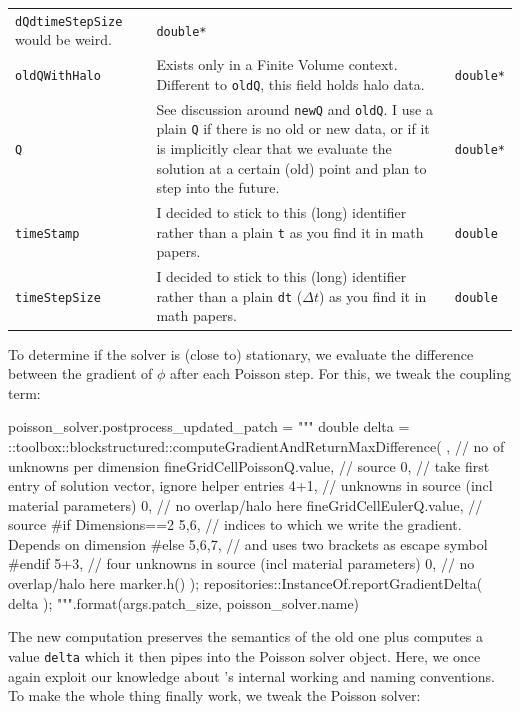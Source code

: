 \begin{table}
\begin{center}
\begin{tabular}{l|p{9cm}|p{2cm}}
     \texttt{dQdtimeStepSize} would be weird. & \texttt{double*}
     \\
   \texttt{oldQWithHalo} 
     & Exists only in a Finite Volume context. Different to \texttt{oldQ}, this
     field holds halo data.
     & \texttt{double*}
     \\
   \texttt{Q} 
     & See discussion around \texttt{newQ} and \texttt{oldQ}. I use a plain
     \texttt{Q} if there is no old or new data, or if it is implicitly clear
     that we evaluate the solution at a certain (old) point and plan to step
     into the future. 
     & \texttt{double*} \\
   \texttt{timeStamp} 
     & I decided to stick to this (long) identifier rather than a plain
     \texttt{t} as you find it in math papers. & \texttt{double} \\
   \texttt{timeStepSize} 
     & I decided to stick to this (long) identifier rather than a plain
     \texttt{dt} ($\Delta t$) as you find it in math papers. & \texttt{double}
     \\
  \end{tabular}
 \end{center}
\end{table}

To determine if the solver is (close to) stationary, we evaluate the difference 
between the gradient of $\phi$ after each Poisson step.
For this, we tweak the coupling term: 

\begin{code}
poisson_solver.postprocess_updated_patch = """
 double delta = 
 ::toolbox::blockstructured::computeGradientAndReturnMaxDifference(
   {},      // no of unknowns per dimension
   fineGridCellPoissonQ.value, // source
   0,       // take first entry of solution vector, ignore helper entries
   4+1,     // unknowns in source (incl material parameters)
   0,       // no overlap/halo here
   fineGridCellEulerQ.value, // source
   #if Dimensions==2
   {{5,6}},   // indices to which we write the gradient. Depends on dimension
   #else
   {{5,6,7}}, // and uses two brackets as escape symbol
   #endif
   5+3,     // four unknowns in source (incl material parameters)
   0,       // no overlap/halo here
   marker.h()
 );
 repositories::InstanceOf{}.reportGradientDelta( delta );
""".format(args.patch_size, poisson_solver.name)
\end{code} 

\noindent
The new computation preserves the semantics of the old one plus computes a value \texttt{delta} 
which it then pipes into the Poisson solver object.
Here, we once again exploit our knowledge about \ExaHyPE's internal working and naming conventions.
To make the whole thing finally work, we tweak the Poisson solver:

